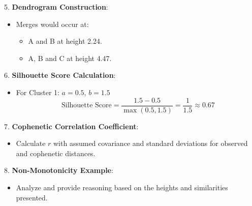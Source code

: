 \documentclass{article}
\begin{document}
5. \textbf{Dendrogram Construction}:
    \begin{itemize}
        \item Merges would occur at:
        \begin{itemize}
            \item A and B at height 2.24.
            \item A, B and C at height 4.47.
        \end{itemize}
    \end{itemize}

6. \textbf{Silhouette Score Calculation}:
    \begin{itemize}
        \item For Cluster 1:  
        \( a = 0.5 \), \( b = 1.5 \)  
        \[
        \text{Silhouette Score} = \frac{1.5 - 0.5}{\max(0.5, 1.5)} = \frac{1}{1.5} \approx 0.67
        \]
    \end{itemize}

7. \textbf{Cophenetic Correlation Coefficient}:
    \begin{itemize}
        \item Calculate \( r \) with assumed covariance and standard deviations for observed and cophenetic distances.
    \end{itemize}

8. \textbf{Non-Monotonicity Example}:
    \begin{itemize}
        \item Analyze and provide reasoning based on the heights and similarities presented.
    \end{itemize}
\end{document}

